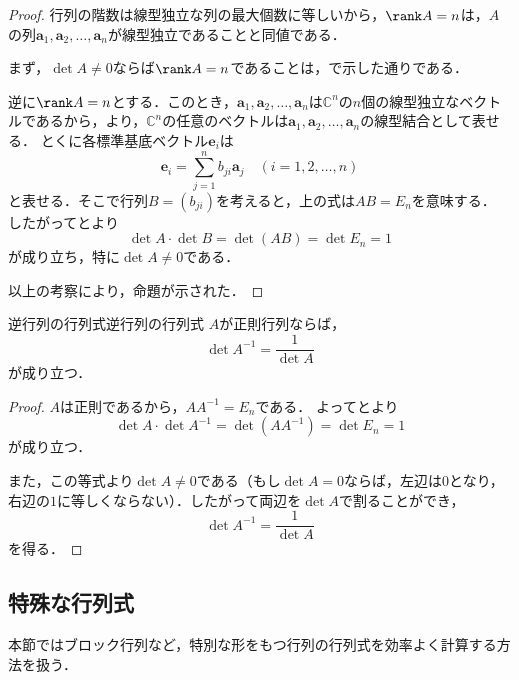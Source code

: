 \begin{tleftbar}
\begin{proof}
  行列の階数は線型独立な列の最大個数に等しいから，$\rank A = n$は，$A$の列$\bm{a}_1, \bm{a}_2, \dots, \bm{a}_n$が線型独立であることと同値である．

  まず，$\det A \ne 0$ならば$\rank A = n$であることは，で示した通りである．

  逆に$\rank A = n$とする．このとき，$\bm{a}_1, \bm{a}_2, \dots, \bm{a}_n$は$\mathbb{C}^n$の$n$個の線型独立なベクトルであるから，より，$\mathbb{C}^n$の任意のベクトルは$\bm{a}_1, \bm{a}_2, \dots, \bm{a}_n$の線型結合として表せる．
  とくに各標準基底ベクトル$\bm{e}_i$は
  \[
  \bm{e}_i = \sum_{j=1}^{n} b_{ji} \bm{a}_j \quad (i = 1, 2, \dots, n)
  \]
  と表せる．そこで行列$B = (b_{ji})$を考えると，上の式は$AB = E_n$を意味する．
  したがってとより
  \[
  \det A \cdot \det B = \det(AB) = \det E_n = 1
  \]
  が成り立ち，特に$\det A \ne 0$である．

  以上の考察により，命題が示された．
\end{proof}
\end{tleftbar}

\begin{cor}{逆行列の行列式}{逆行列の行列式}
  $A$が正則行列ならば，
  \[
    \det A^{-1} = \frac{1}{\det A}
  \]
  が成り立つ．
\end{cor}

\begin{tleftbar}
\begin{proof}
  $A$は正則であるから，$AA^{-1}=E_n$である．
  よってとより
  \[
    \det A \cdot \det A^{-1}
    = \det(AA^{-1})
    = \det E_n
    = 1
  \]
  が成り立つ．

  また，この等式より$\det A \ne 0$である（もし$\det A = 0$ならば，左辺は$0$となり，右辺の$1$に等しくならない）．したがって両辺を$\det A$で割ることができ，
  \[
    \det A^{-1} = \frac{1}{\det A}
  \]
  を得る．
\end{proof}
\end{tleftbar}

\subsection{特殊な行列式}


本節ではブロック行列など，特別な形をもつ行列の行列式を効率よく計算する方法を扱う．



